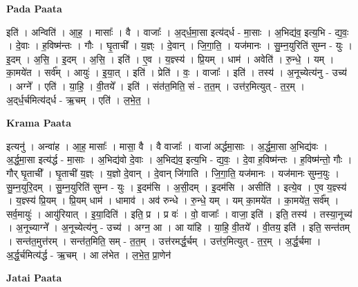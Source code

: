 \documentclass[17pt]{extarticle}
\begin{document}
\textbf{Pada Paata} \newline

इति॑ । अन्विति॑ । आ॒ह॒ । मासाः᳚ । वै । वाजाः᳚ । अ॒द्‌र्ध॒मा॒सा इत्य॑द्‌र्ध - मा॒साः । अ॒भिद्य॑व॒ इत्य॒भि - द्य॒वः॒ । दे॒वाः । ह॒विष्म॑न्तः । गौः । घृ॒ताची᳚ । य॒ज्ञ्ः । दे॒वान् । जि॒गा॒ति॒ । यज॑मानः । सु॒म्न॒युरिति॑ सुम्न - युः । इ॒दम् । अ॒सि॒ । इ॒दम् । अ॒सि॒ । इति॑ । ए॒व । य॒ज्ञ्स्य॑ । प्रि॒यम् । धाम॑ । अवेति॑ । रु॒न्धे॒ । यम् । का॒मये॑त । सर्व᳚म् । आयुः॑ । इ॒या॒त् । इति॑ । प्रेति॑ । वः॒ । वाजाः᳚ । इति॑ । तस्य॑ । अ॒नूच्येत्य॑नु - उच्य॑ । अग्ने᳚ । एति॑ । या॒हि॒ । वी॒तये᳚ । इति॑ । संत॑त॒मिति॒ सं - त॒त॒म् । उत्त॑र॒मित्युत् - त॒र॒म् । अ॒द्‌र्ध॒र्चमित्य॑द्‌र्ध - ऋ॒चम् । एति॑ । ल॒भे॒त॒ ।  \newline


\textbf{Krama Paata} \newline

इत्यनु॑ । अन्वा॑ह । आ॒ह॒ मासाः᳚ । मासा॒ वै । वै वाजाः᳚ । वाजा॑ अर्द्धमा॒साः । अ॒र्द्ध॒मा॒सा अ॒भिद्य॑वः । अ॒र्द्ध॒मा॒सा इत्य॑र्द्ध - मा॒साः । अ॒भिद्य॑वो दे॒वाः । अ॒भिद्य॑व॒ इत्य॒भि - द्य॒वः॒ । दे॒वा ह॒विष्म॑न्तः । ह॒विष्म॑न्तो॒ गौः । गौर् घृ॒ताची᳚ । घृ॒ताची॑ य॒ज्ञ्ः । य॒ज्ञो दे॒वान् । दे॒वान् जि॑गाति । जि॒गा॒ति॒ यज॑मानः । यज॑मानः सुम्न॒युः । सु॒म्न॒युरि॒दम् । सु॒म्न॒युरिति॑ सुम्न - युः । इ॒दम॑सि । अ॒सी॒दम् । इ॒दम॑सि । असीति॑ । इत्ये॒व । ए॒व य॒ज्ञ्स्य॑ । य॒ज्ञ्स्य॑ प्रि॒यम् । प्रि॒यम् धाम॑ । धामाव॑ । अव॑ रुन्धे । रु॒न्धे॒ यम् । यम् का॒मये॑त । का॒मये॑त॒ सर्व᳚म् । सर्व॒मायुः॑ । आयु॑रियात् । इ॒या॒दिति॑ । इति॒ प्र । प्र वः॑ । वो॒ वाजाः᳚ । वाजा॒ इति॑ । इति॒ तस्य॑ । तस्या॒नूच्य॑ । अ॒नूच्याग्ने᳚ । अ॒नूच्येत्य॑नु - उच्य॑ । अग्न॒ आ । आ या॑हि । या॒हि॒ वी॒तये᳚ । वी॒तय॒ इति॑ । इति॒ सन्त॑तम् । सन्त॑त॒मुत्त॑रम् । सन्त॑त॒मिति॒ सम् - त॒त॒म् । उत्त॑रमर्द्ध॒र्चम् । उत्त॑र॒मित्युत् - त॒र॒म् । अ॒र्द्ध॒र्चमा । अ॒र्द्ध॒र्चमित्य॑र्द्ध - ऋ॒चम् । आ ल॑भेत । ल॒भे॒त॒ प्रा॒णेन॑ \newline

\textbf{Jatai Paata} \newline
\end{document}
